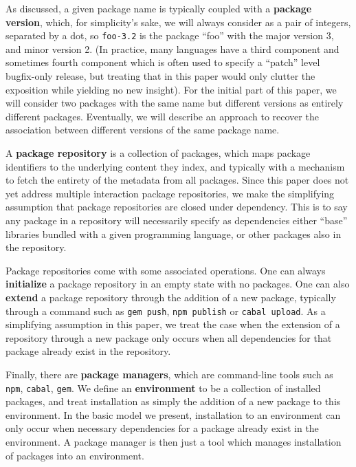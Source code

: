 \documentclass[hoptionsi,review,screen,format=sigconf]{acmart}
\theoremstyle{definition}
\begin{document}
As discussed, a given package name is typically coupled with a \textbf{package version}, which, for simplicity's sake, we will always consider as a pair of integers, separated by a dot, so \texttt{foo-3.2} is the package ``foo'' with the major version 3, and minor version 2. (In practice, many languages have a third component and sometimes fourth component which is often used to specify a ``patch'' level bugfix-only release, but treating that in this paper would only clutter the exposition while yielding no new insight). For the initial part of this paper, we will consider two packages with the same name but different versions as entirely different packages. Eventually, we will describe an approach to recover the association between different versions of the same package name.

A \textbf{package repository} is a collection of packages, which maps package identifiers to the underlying content they index, and typically with a mechanism to fetch the entirety of the metadata from all packages. Since this paper does not yet address multiple interaction package repositories, we make the simplifying assumption that package repositories are closed under dependency. This is to say any package in a repository will necessarily specify as dependencies either ``base'' libraries bundled with a given programming language, or other packages also in the repository. 

Package repositories come with some associated operations. One can always \textbf{initialize} a package repository in an empty state with no packages. One can also \textbf{extend} a package repository through the addition of a new package, typically through a command such as \texttt{gem push}, \texttt{npm publish} or \texttt{cabal upload}. \cite{npm, cabal, gem} As a simplifying assumption in this paper, we treat the case when the extension of a repository through a new package only occurs when all dependencies for that package already exist in the repository.

Finally, there are \textbf{package managers}, which are command-line tools such as \texttt{npm}, \texttt{cabal}, \texttt{gem}. We define an \textbf{environment} to be a collection of installed packages, and treat installation as simply the addition of a new package to this environment. In the basic model we present, installation to an environment can only occur when necessary dependencies for a package already exist in the environment. A package manager is then just a tool which manages installation of packages into an environment.
\end{document}
